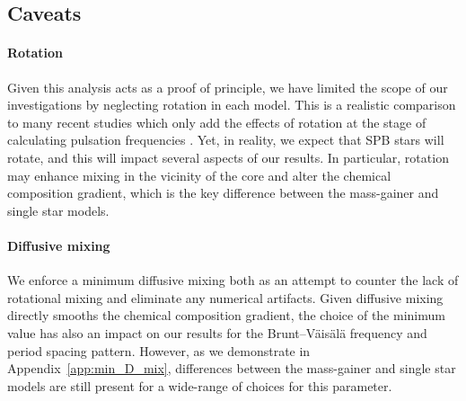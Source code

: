 \documentclass[twocolumn, twocolappendix, oneside]{aastex631}
\newcommand{\bvf}{Brunt–Väisälä frequency\xspace}
\begin{document}



\subsection{Caveats}\label{sec:caveats}
\paragraph{Rotation} Given this analysis acts as a proof of principle, we have limited the scope of our investigations by neglecting rotation in each model. This is a realistic comparison to many recent studies which only add the effects of rotation at the stage of calculating pulsation frequencies \citep[e.g.][]{Michielsen+2021}. Yet, in reality, we expect that SPB stars will rotate, and this will impact several aspects of our results. In particular, rotation may enhance mixing in the vicinity of the core and alter the chemical composition gradient, which is the key difference between the mass-gainer and single star models.

\paragraph{Diffusive mixing} We enforce a minimum diffusive mixing both as an attempt to counter the lack of rotational mixing and eliminate any numerical artifacts. Given diffusive mixing directly smooths the chemical composition gradient, the choice of the minimum value has also an impact on our results for the \bvf and period spacing pattern. However, as we demonstrate in Appendix~\ref{app:min_D_mix}, differences between the mass-gainer and single star models are still present for a wide-range of choices for this parameter.
\end{document}
